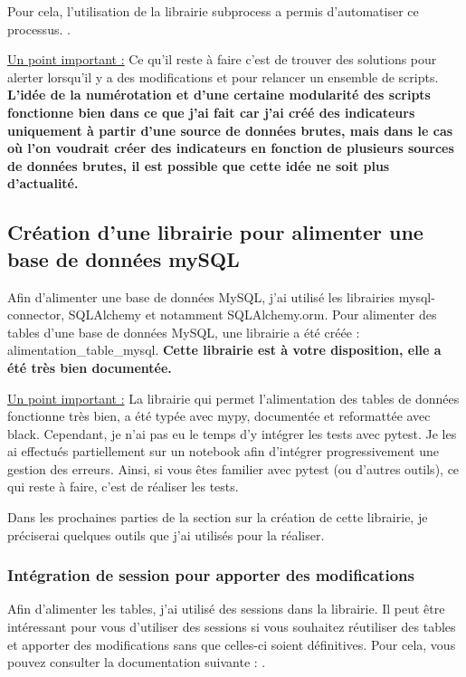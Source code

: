 \documentclass[12pt]{article}
\begin{document}
Pour cela, l'utilisation de la librairie subprocess a permis d'automatiser ce processus.  \cite{subprocess}.\newline

\underline{Un point important :}\newline
Ce qu'il reste à faire c'est de trouver des solutions pour alerter lorsqu'il y a 
des modifications et pour relancer un ensemble de scripts. 
\textbf{L'idée de la numérotation et d'une certaine modularité des scripts 
fonctionne bien dans ce que j'ai fait car j'ai créé des indicateurs uniquement 
à partir d'une source de données brutes, mais dans le cas où l'on voudrait créer 
des indicateurs en fonction de plusieurs sources de données brutes, il est possible que 
cette idée ne soit plus d'actualité.}

\subsection{Création d'une librairie pour alimenter une base de données mySQL}

Afin d'alimenter une base de données MySQL, j'ai utilisé les librairies mysql-connector, 
SQLAlchemy et notamment SQLAlchemy.orm. Pour alimenter des tables d'une base de données MySQL, 
une librairie a été créée : alimentation\_table\_mysql. \textbf{Cette librairie est à votre disposition,
elle a été très bien documentée.}\newline

\underline{Un point important :}\newline
La librairie qui permet l'alimentation des tables de données fonctionne très bien, 
a été typée avec mypy, documentée et reformattée avec black. Cependant, je 
n'ai pas eu le temps d'y intégrer les tests avec pytest. Je les ai effectués 
partiellement sur un notebook afin d'intégrer progressivement une gestion des erreurs. 
Ainsi, si vous êtes familier avec pytest (ou d'autres outils), ce qui reste à faire, 
c'est de réaliser les tests.\newline

Dans les prochaines parties de la section sur la création de cette librairie, 
je préciserai quelques outils que j'ai utilisés pour la réaliser.
\subsubsection{Intégration de session pour apporter des modifications}

Afin d'alimenter les tables, j'ai utilisé des sessions dans la librairie. 
Il peut être intéressant pour vous d'utiliser des sessions si vous souhaitez 
réutiliser des tables et apporter des modifications sans que celles-ci soient 
définitives. Pour cela, vous pouvez consulter la documentation suivante : \cite{session}.
\end{document}
